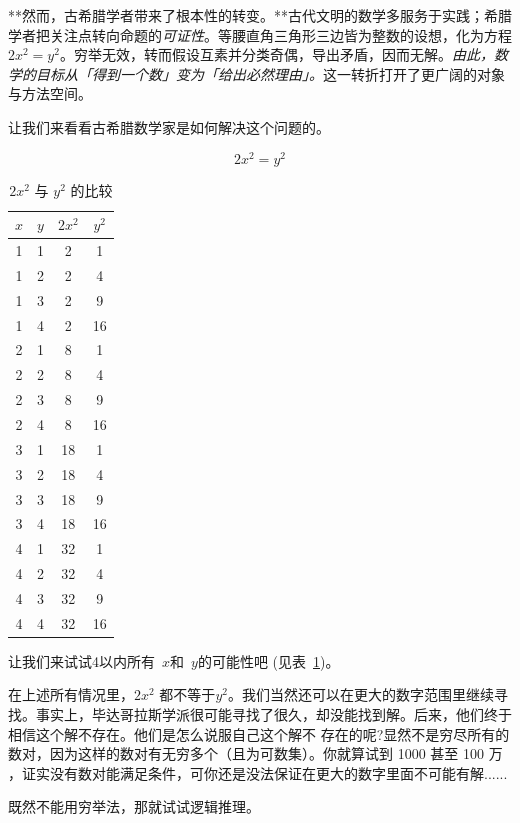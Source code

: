 **然而，古希腊学者带来了根本性的转变。**古代文明的数学多服务于实践；希腊学者把关注点转向命题的\emph{可证性}。等腰直角三角形三边皆为整数的设想，化为方程 $2x^2=y^2$。穷举无效，转而假设互素并分类奇偶，导出矛盾，因而无解。\emph{由此，数学的目标从「得到一个数」变为「给出必然理由」。}这一转折打开了更广阔的对象与方法空间。

让我们来看看古希腊数学家是如何解决这个问题的。

\begin{equation}
2x^2=y^2 \label{eqn}
\end{equation}

\begin{table}[htbp]
\centering
\caption{$2x^2$ 与 $y^2$ 的比较}
\begin{tabular}{|c|c|c|c|}
\hline
$x$ & $y$ & $2x^2$ & $y^2$ \\
\hline
1 & 1 & 2 & 1 \\
\hline
1 & 2 & 2 & 4 \\
\hline
1 & 3 & 2 & 9 \\
\hline
1 & 4 & 2 & 16 \\
\hline
2 & 1 & 8 & 1 \\
\hline
2 & 2 & 8 & 4 \\
\hline
2 & 3 & 8 & 9 \\
\hline
2 & 4 & 8 & 16 \\
\hline
3 & 1 & 18 & 1 \\
\hline
3 & 2 & 18 & 4 \\
\hline
3 & 3 & 18 & 9 \\
\hline
3 & 4 & 18 & 16 \\
\hline
4 & 1 & 32 & 1 \\
\hline
4 & 2 & 32 & 4 \\
\hline
4 & 3 & 32 & 9 \\
\hline
4 & 4 & 32 & 16 \\
\hline
\end{tabular}
\label{tab:example}
\end{table}
让我们来试试4以内所有~$x$和~$y$的可能性吧 (见表~\ref{tab:example})。

在上述所有情况里，$2x^2$ 都不等于$y^2$。我们当然还可以在更大的数字范围里继续寻找。事实上，毕达哥拉斯学派很可能寻找了很久，却没能找到解。后来，他们终于相信这个解不存在。他们是怎么说服自己这个解不 存在的呢?显然不是穷尽所有的数对，因为这样的数对有{无穷多个（且为可数集）}。你就算试到 1000 甚至 100 万 ，证实没有数对能满足条件，可你还是没法保证在更大的数字里面不可能有解......

既然不能用穷举法，那就试试逻辑推理。


